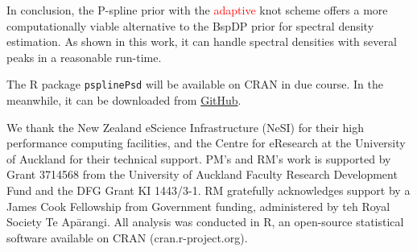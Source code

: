 \documentclass[twocolumn,final]{svjour3}
\begin{document}
In conclusion, the P-spline prior with the \textcolor{red}{adaptive} knot scheme offers a more computationally viable alternative to the BspDP prior for spectral density estimation.  As shown in this work, it can handle spectral densities with several peaks in a reasonable run-time.

The \textsf{R} package \texttt{psplinePsd} will be available on CRAN in due course.  In the meanwhile, it can be downloaded from \href{https://github.com/pmat747/psplinePsd}{GitHub}. 

\begin{acknowledgements}
	We thank the New Zealand eScience Infrastructure (NeSI) for their high performance computing facilities, and the Centre for eResearch at the University of Auckland for their technical support. PM's and RM's work is supported by Grant 3714568 from the University of Auckland Faculty Research Development Fund and the DFG Grant KI 1443/3-1. RM gratefully acknowledges support by a James Cook Fellowship from Government funding, administered by teh Royal Society Te Ap\={a}rangi.  All analysis was conducted in \textsf{R}, an open-source statistical software available on \textsf{CRAN} (cran.r-project.org).
\end{acknowledgements}



%

\end{document}
